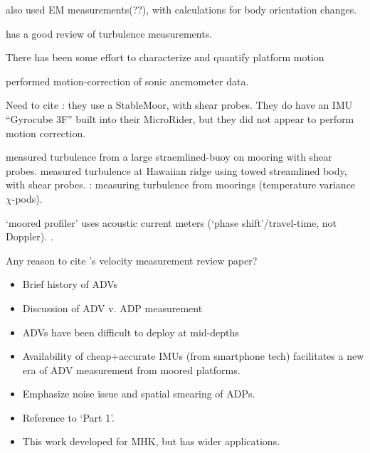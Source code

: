 \cite[]{Hayes++1984} also used EM measurements(??), with calculations for body orientation changes.

\cite{Lueck++2002} has a good review of turbulence measurements. 

There has been some effort to characterize and quantify platform motion 

\cite{Miller++2008} performed motion-correction of sonic anemometer data.

Need to cite \cite[]{Paskyabi+Fer2013}: they use a StableMoor, with shear probes. They do have an IMU ``Gyrocube 3F'' built into their MicroRider, but they did not appear to perform motion correction.

\cite[]{Lueck+Huang1999} measured turbulence from a large straemlined-buoy on mooring with shear probes. \cite[]{Klymak++2003} measured turbulence at Hawaiian ridge using towed streamlined body, with shear probes. \cite[]{Moum+Nash2009b}: measuring turbulence from moorings (temperature variance $\chi$-pods).

\cite[]{Doherty++1999} `moored profiler' uses acoustic current meters (`phase shift'/travel-time, not Doppler). \cite[]{Nash++2004, Alford2010}.

Any reason to cite \cite{Williams1996}'s velocity measurement review paper?

\begin{itemize}
\item Brief history of ADVs
\item Discussion of ADV v. ADP measurement
\item ADVs have been difficult to deploy at mid-depths
\item Availability of cheap+accurate IMUs (from smartphone tech) facilitates a new era of ADV measurement from moored platforms.
\item Emphasize noise issue and spatial smearing of ADPs.
\item Reference to `Part 1'.
\item This work developed for MHK, but has wider applications.
\end{itemize}



